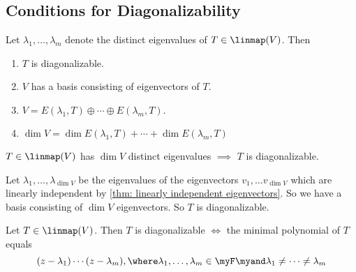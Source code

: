 \subsection{Conditions for Diagonalizability}
\setcounter{thm}{54}
\begin{thm} 
  \label{thm: conditions equivalent to diagonalizability}
  Let $\lambda_1, \dots,\lambda_m$ denote the distinct eigenvalues of $T\in \linmap (V)$. Then
  \begin{enumerate}[label=(\alph*)]
    \item $T$ is diagonalizable.
    \item $V$ has a basis consisting of eigenvectors of $T$.
    \item $V=E(\lambda_1, T) \oplus \cdots \oplus E(\lambda_m, T).$
    \item $\dim V = \dim E(\lambda_1, T) + \cdots + \dim E(\lambda_m, T)$
  \end{enumerate}
\end{thm}

\setcounter{thm}{57}
\begin{thm} 
  \label{thm: enough eigenvalues implies diagonalizability}
  $T\in \linmap(V)$ has $\dim V$ distinct eigenvalues $\implies$ $T$ is diagonalizable.
\end{thm}
\begin{prf}
  Let $\lambda_1, \ldots, \lambda_{\dim V}$ be the eigenvalues of the eigenvectors $v_1, \ldots v_{\dim V}$ which are linearly independent by \autoref{thm: linearly independent eigenvectors}. So we have a basis consisting of $\dim V$ eigenvectors. So $T$ is diagonalizable.
\end{prf}

\setcounter{thm}{61}
\begin{thm}
  \label{thm: necessary and sufficient condition for diagonalizability}
  Let $T\in \linmap (V)$\footnotemark[1]. Then $T$ is diagonalizable $\iff$ the minimal polynomial of $T$ equals
  \begin{equation}
    (z-\lambda_1) \cdots (z-\lambda_m), \where \lambda_1, \dots, \lambda_m \in \myF \myand \lambda_1 \neq \cdots \neq \lambda_m
  \end{equation}
\end{thm}

